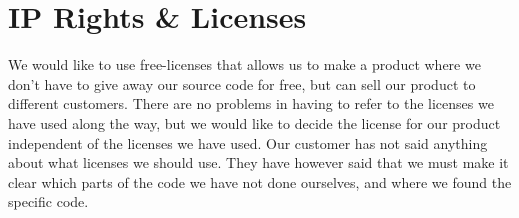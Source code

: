 
\section{IP Rights \& Licenses}
We would like to use free-licenses that allows us to make a product where we don’t have to give away our source code for free, but can sell our product to different customers. There are no problems in having to refer to the licenses we have used along the way, but we would like to decide the license for our product independent of the licenses we have used. 
\newline
\newline
Our customer has not said anything about what licenses we should use. They have however said that we must make it clear which parts of the code we have not done ourselves, and where we found the specific code.

\newpage

